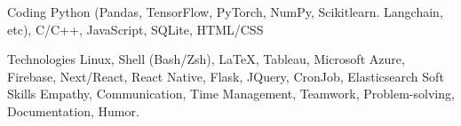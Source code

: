 

\begin{cvskills}

  \cvskill
    {Coding} %
    {Python (Pandas, TensorFlow, PyTorch, NumPy, Scikit\-learn. Langchain, etc), C/C++, JavaScript, SQLite, HTML/CSS} %

  \cvskill
    {Technologies} %
    {Linux, Shell (Bash/Zsh), \LaTeX, Tableau, Microsoft Azure, Firebase, Next/React, React Native, Flask, JQuery, CronJob, Elasticsearch} %
  \cvskill
    {Soft Skills} %
    {Empathy, Communication, Time Management, Teamwork, Problem-solving, Documentation, Humor.} %
    

\end{cvskills}
